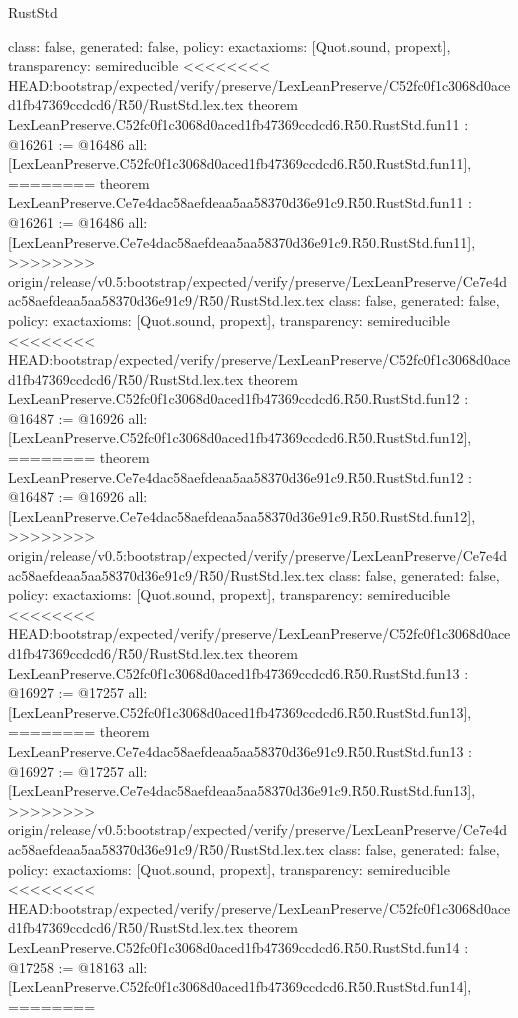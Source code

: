 \begin{lexlean}{RustStd}
\begin{coremodule}
{\begin{coremodule}
{{{{{{{{{{{{{{  class: false,
  generated: false,
  policy: exact{axioms: [Quot.sound, propext]},
  transparency: semireducible
}
<<<<<<<< HEAD:bootstrap/expected/verify/preserve/LexLeanPreserve/C52fc0f1c3068d0aced1fb47369ccdcd6/R50/RustStd.lex.tex
theorem LexLeanPreserve.C52fc0f1c3068d0aced1fb47369ccdcd6.R50.RustStd.fun11 : @16261 := @16486 {
  all: [LexLeanPreserve.C52fc0f1c3068d0aced1fb47369ccdcd6.R50.RustStd.fun11],
========
theorem LexLeanPreserve.Ce7e4dac58aefdeaa5aa58370d36e91c9.R50.RustStd.fun11 : @16261 := @16486 {
  all: [LexLeanPreserve.Ce7e4dac58aefdeaa5aa58370d36e91c9.R50.RustStd.fun11],
>>>>>>>> origin/release/v0.5:bootstrap/expected/verify/preserve/LexLeanPreserve/Ce7e4dac58aefdeaa5aa58370d36e91c9/R50/RustStd.lex.tex
  class: false,
  generated: false,
  policy: exact{axioms: [Quot.sound, propext]},
  transparency: semireducible
}
<<<<<<<< HEAD:bootstrap/expected/verify/preserve/LexLeanPreserve/C52fc0f1c3068d0aced1fb47369ccdcd6/R50/RustStd.lex.tex
theorem LexLeanPreserve.C52fc0f1c3068d0aced1fb47369ccdcd6.R50.RustStd.fun12 : @16487 := @16926 {
  all: [LexLeanPreserve.C52fc0f1c3068d0aced1fb47369ccdcd6.R50.RustStd.fun12],
========
theorem LexLeanPreserve.Ce7e4dac58aefdeaa5aa58370d36e91c9.R50.RustStd.fun12 : @16487 := @16926 {
  all: [LexLeanPreserve.Ce7e4dac58aefdeaa5aa58370d36e91c9.R50.RustStd.fun12],
>>>>>>>> origin/release/v0.5:bootstrap/expected/verify/preserve/LexLeanPreserve/Ce7e4dac58aefdeaa5aa58370d36e91c9/R50/RustStd.lex.tex
  class: false,
  generated: false,
  policy: exact{axioms: [Quot.sound, propext]},
  transparency: semireducible
}
<<<<<<<< HEAD:bootstrap/expected/verify/preserve/LexLeanPreserve/C52fc0f1c3068d0aced1fb47369ccdcd6/R50/RustStd.lex.tex
theorem LexLeanPreserve.C52fc0f1c3068d0aced1fb47369ccdcd6.R50.RustStd.fun13 : @16927 := @17257 {
  all: [LexLeanPreserve.C52fc0f1c3068d0aced1fb47369ccdcd6.R50.RustStd.fun13],
========
theorem LexLeanPreserve.Ce7e4dac58aefdeaa5aa58370d36e91c9.R50.RustStd.fun13 : @16927 := @17257 {
  all: [LexLeanPreserve.Ce7e4dac58aefdeaa5aa58370d36e91c9.R50.RustStd.fun13],
>>>>>>>> origin/release/v0.5:bootstrap/expected/verify/preserve/LexLeanPreserve/Ce7e4dac58aefdeaa5aa58370d36e91c9/R50/RustStd.lex.tex
  class: false,
  generated: false,
  policy: exact{axioms: [Quot.sound, propext]},
  transparency: semireducible
}
<<<<<<<< HEAD:bootstrap/expected/verify/preserve/LexLeanPreserve/C52fc0f1c3068d0aced1fb47369ccdcd6/R50/RustStd.lex.tex
theorem LexLeanPreserve.C52fc0f1c3068d0aced1fb47369ccdcd6.R50.RustStd.fun14 : @17258 := @18163 {
  all: [LexLeanPreserve.C52fc0f1c3068d0aced1fb47369ccdcd6.R50.RustStd.fun14],
========
}}}}}}}}}}}}}}}}}
\end{coremodule}}
\end{coremodule}
\end{lexlean}
